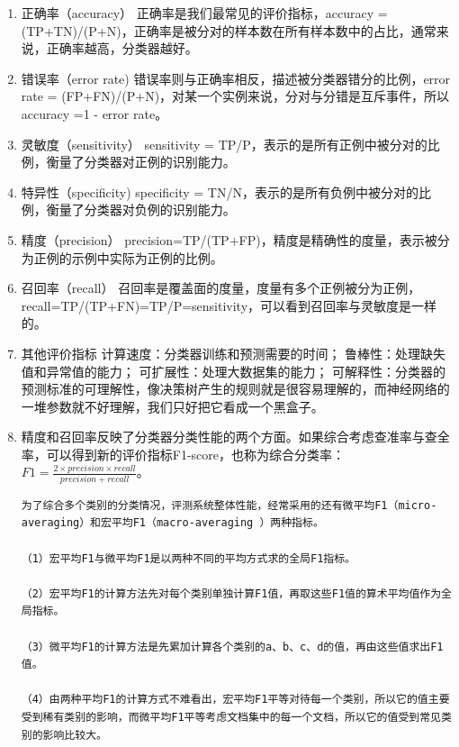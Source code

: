 \begin{enumerate}
\def\labelenumi{\arabic{enumi})}
\item
  正确率（accuracy） 正确率是我们最常见的评价指标，accuracy =
  (TP+TN)/(P+N)，正确率是被分对的样本数在所有样本数中的占比，通常来说，正确率越高，分类器越好。
\item
  错误率（error rate)
  错误率则与正确率相反，描述被分类器错分的比例，error rate =
  (FP+FN)/(P+N)，对某一个实例来说，分对与分错是互斥事件，所以accuracy =1
  - error rate。
\item
  灵敏度（sensitivity） sensitivity =
  TP/P，表示的是所有正例中被分对的比例，衡量了分类器对正例的识别能力。
\item
  特异性（specificity) specificity =
  TN/N，表示的是所有负例中被分对的比例，衡量了分类器对负例的识别能力。
\item
  精度（precision）
  precision=TP/(TP+FP)，精度是精确性的度量，表示被分为正例的示例中实际为正例的比例。
\item
  召回率（recall）
  召回率是覆盖面的度量，度量有多个正例被分为正例，recall=TP/(TP+FN)=TP/P=sensitivity，可以看到召回率与灵敏度是一样的。
\item
  其他评价指标 计算速度：分类器训练和预测需要的时间；
  鲁棒性：处理缺失值和异常值的能力； 可扩展性：处理大数据集的能力；
  可解释性：分类器的预测标准的可理解性，像决策树产生的规则就是很容易理解的，而神经网络的一堆参数就不好理解，我们只好把它看成一个黑盒子。
\item
  精度和召回率反映了分类器分类性能的两个方面。如果综合考虑查准率与查全率，可以得到新的评价指标F1-score，也称为综合分类率：$F1=\frac{2 \times precision \times recall}{precision + recall}​$。

\begin{verbatim}
为了综合多个类别的分类情况，评测系统整体性能，经常采用的还有微平均F1（micro-averaging）和宏平均F1（macro-averaging ）两种指标。

（1）宏平均F1与微平均F1是以两种不同的平均方式求的全局F1指标。

（2）宏平均F1的计算方法先对每个类别单独计算F1值，再取这些F1值的算术平均值作为全局指标。

（3）微平均F1的计算方法是先累加计算各个类别的a、b、c、d的值，再由这些值求出F1值。

（4）由两种平均F1的计算方式不难看出，宏平均F1平等对待每一个类别，所以它的值主要受到稀有类别的影响，而微平均F1平等考虑文档集中的每一个文档，所以它的值受到常见类别的影响比较大。
\end{verbatim}
\end{enumerate}

